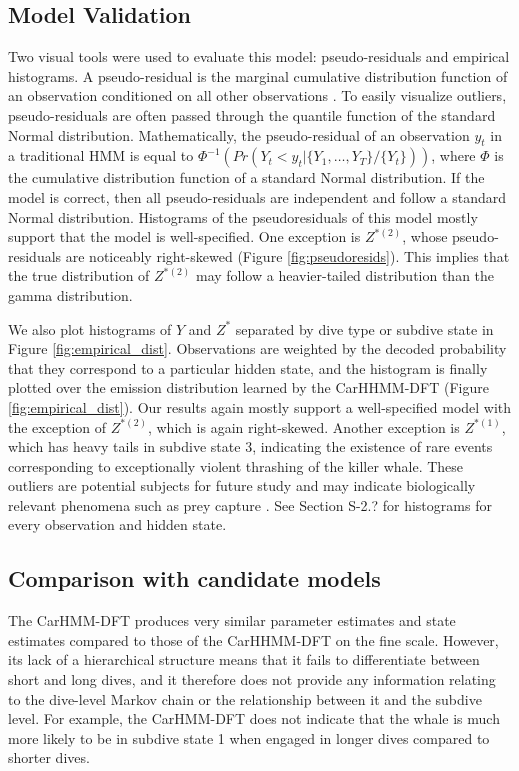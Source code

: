\subsection{Model Validation}
\label{subsec:model_validation}

Two visual tools were used to evaluate this model: pseudo-residuals and empirical histograms. A pseudo-residual is the marginal cumulative distribution function of an observation conditioned on all other observations \citep{Zucchini:2016}. To easily visualize outliers, pseudo-residuals are often passed through the quantile function of the standard Normal distribution. Mathematically, the pseudo-residual of an observation $y_t$ in a traditional HMM is equal to $\Phi^{-1} \left(Pr(Y_t < y_t|\{Y_1,\ldots,Y_T\}/\{Y_t\}) \right)$, where $\Phi$ is the cumulative distribution function of a standard Normal distribution. If the model is correct, then all pseudo-residuals are independent and follow a standard Normal distribution. Histograms of the pseudoresiduals of this model mostly support that the model is well-specified. One exception is $Z^{*(2)}$, whose pseudo-residuals are noticeably right-skewed (Figure \ref{fig:pseudoresids}). This implies that the true distribution of $Z^{*(2)}$ may follow a heavier-tailed distribution than the gamma distribution. 

We also plot histograms of $Y$ and $Z^*$ separated by dive type or subdive state in Figure \ref{fig:empirical_dist}. Observations are weighted by the decoded probability that they correspond to a particular hidden state, and the histogram is finally plotted over the emission distribution learned by the CarHHMM-DFT (Figure \ref{fig:empirical_dist}). Our results again mostly support a well-specified model with the exception of $Z^{*(2)}$, which is again right-skewed. Another exception is $Z^{*(1)}$, which has heavy tails in subdive state 3, indicating the existence of rare events corresponding to exceptionally violent thrashing of the killer whale. These outliers are potential subjects for future study and may indicate biologically relevant phenomena such as prey capture \citep{Tennessen:2019a}. See Section S-2.? for histograms for every observation and hidden state. 

\subsection{Comparison with candidate models}

The CarHMM-DFT produces very similar parameter estimates and state estimates compared to those of the CarHHMM-DFT on the fine scale. However, its lack of a hierarchical structure means that it fails to differentiate between short and long dives, and it therefore does not provide any information relating to the dive-level Markov chain or the relationship between it and the subdive level. For example, the CarHMM-DFT does not indicate that the whale is much more likely to be in subdive state 1 when engaged in longer dives compared to shorter dives.

